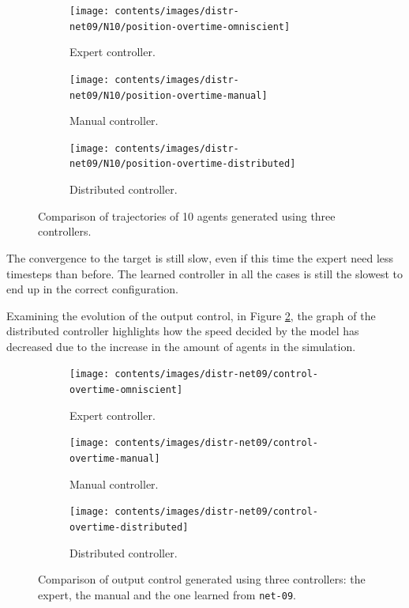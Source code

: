 \begin{figure}[!htb]
	\begin{center}
		\begin{subfigure}[h]{0.325\textwidth}
			\centering
			\texttt{[image: contents/images/distr-net09/N10/position-overtime-omniscient]}%
			\caption{Expert controller.}
		\end{subfigure}
		\hfill
	\begin{subfigure}[h]{0.325\textwidth}
		\centering
		\texttt{[image: contents/images/distr-net09/N10/position-overtime-manual]}%
		\caption{Manual controller.}
	\end{subfigure}
	\hfill
	\begin{subfigure}[h]{0.325\textwidth}
		\centering
		\texttt{[image: contents/images/distr-net09/N10/position-overtime-distributed]}
		\caption{Distributed controller.}
	\end{subfigure}
\end{center}
	\caption[Evaluation of the trajectories learned by \texttt{net-09} using 10 
	agents.]{Comparison of trajectories of 10 agents generated using three 
	controllers.}
	\label{fig:net09traj10}
\end{figure}

\noindent
The convergence to the target is still slow, even if this time the expert need 
less timesteps than before. The learned controller in all the cases is still the slowest 
to end up in the correct configuration.

Examining the evolution of the output control, in Figure \ref{fig:net09control}, 
the graph of the distributed controller highlights how the speed decided by the 
model has decreased due to the increase in the amount of agents in the 
simulation.
\begin{figure}[!htb]
	\centering
	\begin{subfigure}[h]{0.3\textwidth}
		\centering
		\texttt{[image: contents/images/distr-net09/control-overtime-omniscient]}%
		\caption{Expert controller.}
	\end{subfigure}
	\hfill
	\begin{subfigure}[h]{0.3\textwidth}
		\centering
		\texttt{[image: contents/images/distr-net09/control-overtime-manual]}%
		\caption{Manual controller.}
	\end{subfigure}
	\hfill
	\begin{subfigure}[h]{0.3\textwidth}
		\centering
		\texttt{[image: contents/images/distr-net09/control-overtime-distributed]}
		\caption{Distributed controller.}
	\end{subfigure}
	\caption[Evaluation of the control learned by \texttt{net-09}.]{Comparison 
		of output control generated using three controllers: the expert, the 
		manual and the one learned from \texttt{net-09}.}
	\label{fig:net09control}
\end{figure}

